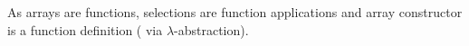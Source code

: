 As arrays are functions, selections are function applications and
array constructor is a function definition (\eg{} via $\lambda$-abstraction).

